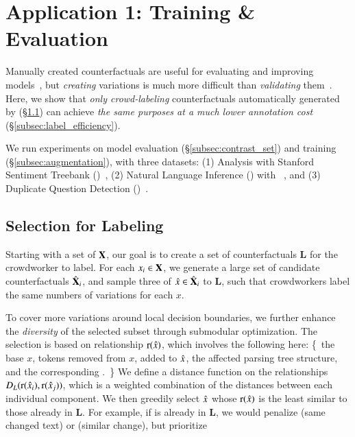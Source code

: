 \section{Application 1: Training \& Evaluation}
\label{sec:app_label}
Manually created counterfactuals are useful for evaluating and improving models~\cite{gardner2020contrast,kaushik2019learning}, but \emph{creating} variations is much more difficult than \emph{validating} them~\cite{ribeiro2018sear}.
Here, we show that \emph{only crowd-labeling} counterfactuals automatically generated by \sysname (\S\ref{subsec:gen_counterfactual_for_labeling}) can achieve \emph{the same purposes at a much lower annotation cost} (\S\ref{subsec:label_efficiency}).

We run experiments on model evaluation (\S\ref{subsec:contrast_set}) and training (\S\ref{subsec:augmentation}), with three datasets:
(1) \sst Analysis with Stanford Sentiment Treebank (\dsst)~\cite{socher2013recursive},
(2) Natural Language Inference (\nli) with \dnli~\cite{bowman-etal-2015-large}, and 
(3) Duplicate Question Detection (\dqqp)~\cite{wang2018glue}.


\subsection{Selection for Labeling}
\label{subsec:gen_counterfactual_for_labeling}


Starting with a set of $\mathbf{X}$, our goal is to create a set of counterfactuals $\mathbf{L}$ for the crowdworker to label.
For each $x_i \in \mathbf{X}$, we generate a large set of candidate counterfactuals $\hat{\mathbf{X}}_i$, and sample three of $\hat{x} \in \hat{\mathbf{X}}_i$ to $\mathbf{L}$, such that crowdworkers label the same numbers of variations for each $x$.

To cover more variations around local decision boundaries, we further enhance the \emph{diversity} of the selected subset through submodular optimization.
The selection is based on relationship $\operatorname*{r}(\hat{x})$, which involves the following here: \{\ the base $x$, tokens removed from $x$, added to $\hat{x}$, the affected parsing tree structure, and the corresponding \tagstr.\ \}
We define a distance function on the relationships $D_L(\operatorname*{r}(\hat{x}_i), \operatorname*{r}(\hat{x}_j))$, which is a weighted combination of the distances between each individual component.
We then greedily select $\hat{x}$ whose $\operatorname*{r}(\hat{x})$ is the least similar to those already in $\mathbf{L}$.
For example, if  is already in $\mathbf{L}$, we would penalize  (same changed text) or  (similar  change), but prioritize 



